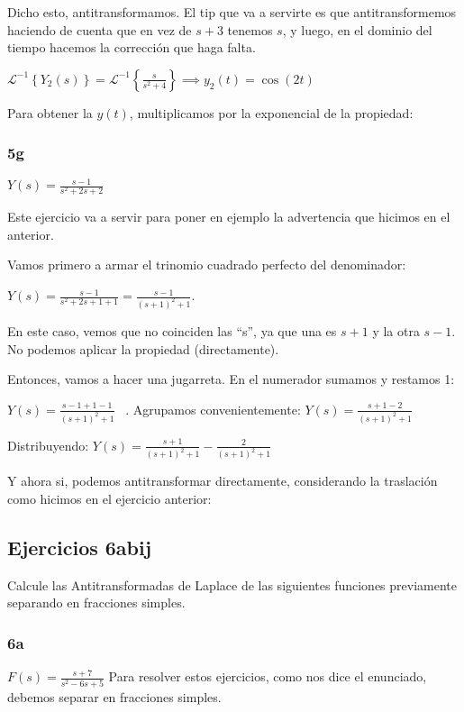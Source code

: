 \documentclass[11pt]{article}
\def\sen{\mathrm{sen}}
\newcommand{\ilapl}[1]{\mathscr{L}^{-1} \left\lbrace {#1} \right\rbrace}
\begin{document}
	Dicho esto, antitransformamos. El tip que va a servirte es que antitransformemos haciendo de cuenta que en vez de $s+3$ tenemos $s$, y luego, en el dominio del tiempo hacemos la corrección que haga falta.
	
	$\displaystyle \ilapl{Y_{2}(s)}=\ilapl{\frac{s}{s^{2}+4}} \implies y_{2}(t)=\cos(2t)$
	
	Para obtener la $y(t)$, multiplicamos por la exponencial de la propiedad: 
	
	\subsubsection{5g}
	$\displaystyle Y(s)=\frac{s-1}{s^{2}+2s+2}$
	
	Este ejercicio va a servir para poner en ejemplo la advertencia que hicimos en el anterior.
	
	Vamos primero a armar el trinomio cuadrado perfecto del denominador:
	
	$\displaystyle Y(s)=\frac{s-1}{s^{2}+2s+1+1}=\frac{s-1}{(s+1)^{2}+1}$.
	
	En este caso, vemos que no coinciden las ``s'', ya que una es $s+1$ y la otra $s-1$. No podemos aplicar la propiedad (directamente).
	
	Entonces, vamos a hacer una jugarreta. En el numerador sumamos y restamos 1:
	
	$\displaystyle Y(s)=\frac{s-1+1-1}{(s+1)^{2}+1} \;\;\;$. Agrupamos convenientemente: $\displaystyle Y(s)=\frac{s+1-2}{(s+1)^{2}+1}$
	
	Distribuyendo: $\displaystyle Y(s)=\frac{s+1}{(s+1)^2+1}-\frac{2}{(s+1)^2+1}$
	
	Y ahora si, podemos antitransformar directamente, considerando la traslación como hicimos en el ejercicio anterior:
	
	\fcolorbox{black}{yellow}{$y(t)=\cos(t)e^{-t}-2\sen(t)e^{-t}$}
	
	\subsection{Ejercicios 6abij}
	Calcule las Antitransformadas de Laplace de las siguientes funciones previamente separando en fracciones simples.
	
	\subsubsection{6a}
	$\displaystyle F(s)=\frac{s+7}{s^2-6s+5}$
	Para resolver estos ejercicios, como nos dice el enunciado, debemos separar en fracciones simples.
	
\end{document}
